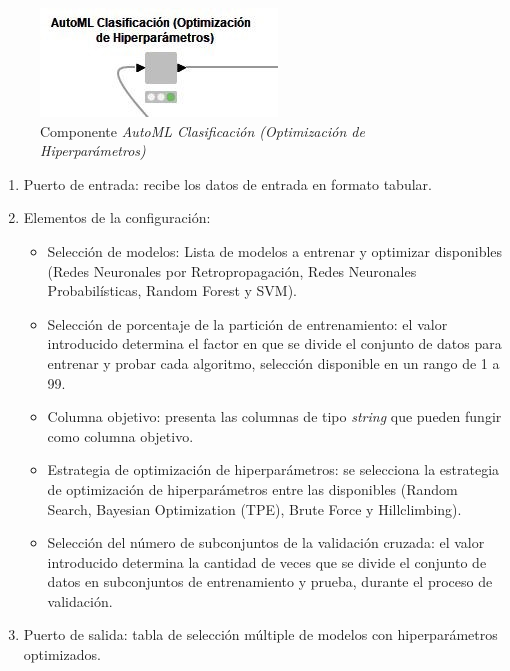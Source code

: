 \begin{figure}[H]
	\centering
	\includegraphics[width=0.35\linewidth]{"figuras/capi 2/hpo/automl-componente-hpo"}
	\caption[Componente AutoML Clasificación (Optimización de Hiperparámetros)]{Componente \textit{AutoML Clasificación (Optimización de Hiperparámetros)}}
	\label{fig:automl-componente-hpo}
\end{figure}
\begin{enumerate}
	\item Puerto de entrada: recibe los datos de entrada en formato tabular.
	\item Elementos de la configuración:
	\begin{itemize}
		\item Selección de modelos: Lista de modelos a entrenar y optimizar disponibles (Redes Neuronales por Retropropagación, Redes Neuronales Probabilísticas, Random Forest y SVM).
		\item Selección de porcentaje de la partición de entrenamiento: el valor introducido determina el factor en que se divide el conjunto de datos para entrenar y probar cada algoritmo, selección disponible en un rango de 1 a 99. 
		\item Columna objetivo: presenta las columnas de tipo \textit{string} que pueden fungir como columna objetivo.
		\item Estrategia de optimización de hiperparámetros: se selecciona la estrategia de optimización de hiperparámetros entre las disponibles (Random Search, Bayesian Optimization (TPE), Brute Force y Hillclimbing).
		\item Selección del número de subconjuntos de la validación cruzada: el valor introducido determina la cantidad de veces que se divide el conjunto de datos en subconjuntos de entrenamiento y prueba, durante el proceso de validación.
	\end{itemize}
	\item Puerto de salida: tabla de selección múltiple de modelos con hiperparámetros optimizados.
\end{enumerate}

